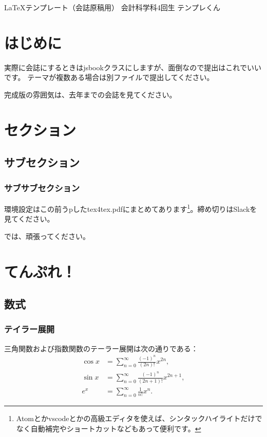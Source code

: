 \documentclass[11pt,b5paper,papersize,dvipdfmx]{jsbook}
\begin{document}
\kaishititle%
  {\LaTeX テンプレート（会誌原稿用）}%
  {会計科学科4回生}%
  {テンプレくん}%


%
\section*{はじめに}
実際に会誌にするときはjsbookクラスにしますが、面倒なので提出はこれでいいです。
テーマが複数ある場合は別ファイルで提出してください。\par
完成版の雰囲気は、去年までの会誌を見てください。

%
\section{セクション}
\subsection{サブセクション}
\subsubsection{サブサブセクション}
環境設定はこの前うpしたtex4tex.pdfにまとめてあります\footnote{Atomとかvscodeとかの高級エディタを使えば、シンタックハイライトだけでなく自動補完やショートカットなどもあって便利です。}。締め切りはSlackを見てください。\par
では、頑張ってください。

%
\section{てんぷれ！}

%
\subsection{数式}

%
\subsubsection{テイラー展開}
三角関数および指数関数のテーラー展開は次の通りである：
\begin{align}
    \cos x &= \sum_{n=0}^\infty \frac{(-1)^n}{(2n)!} x^{2n}, \label{eq:cos}\\
    \sin x &= \sum_{n=0}^\infty \frac{(-1)^n}{(2n+1)!} x^{2n+1}, \label{eq:sin}\\
    e^x &= \sum_{n=0}^\infty \frac{1}{n!} x^n. \label{eq:exp}
\end{align}
\end{document}
